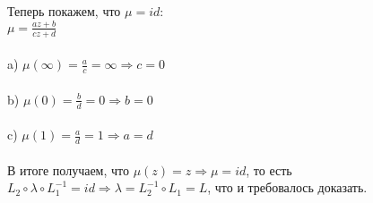 Теперь покажем, что $\mu = id$: \\
$\mu = \frac{az + b}{cz + d}$ \\ \\
a) $\mu(\infty) = \frac{a}{c} = \infty \Rightarrow c = 0$ \\ \\
b) $\mu(0) = \frac{b}{d} = 0 \Rightarrow b = 0$ \\ \\
c) $\mu(1) = \frac{a}{d} = 1 \Rightarrow a = d$ \\ \\
В итоге получаем, что $\mu(z) = z \Rightarrow \mu = id$,
то есть $L_2 \circ \lambda \circ L_1^{-1} = id \Rightarrow \lambda = L_2^{-1} \circ L_1 = L$, что и требовалось доказать.